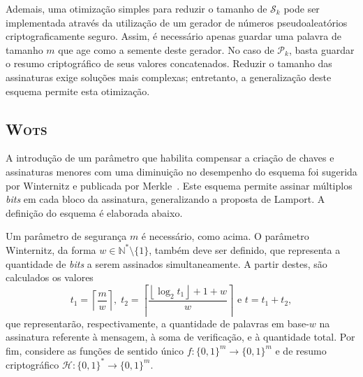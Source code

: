 \documentclass{ufsctex/ufsctex}
\newcommand{\hh}{\mathcal{H}}
\newcommand{\pk}{\mathcal{P}_{k}}
\newcommand{\sk}{\mathcal{S}_{k}}
\newcommand{\binwds}[1]{\{0, 1\}^{#1}}
\newcommand{\fhash}[1]{\hh{}: \binwds{*} \longrightarrow{} \binwds{#1}}
\newcommand{\wots}{\textsc{Wots}}
\begin{document}
Ademais, uma otimização simples para reduzir o tamanho de $\sk{}$ pode ser
implementada através da utilização de um gerador de números pseudoaleatórios
criptograficamente seguro. Assim, é necessário apenas guardar uma palavra de
tamanho $m$ que age como a semente deste gerador. No caso de $\pk{}$, basta
guardar o resumo criptográfico de seus valores concatenados. Reduzir o tamanho
das assinaturas exige soluções mais complexas; entretanto, a generalização
deste esquema permite esta otimização.

\subsection{\wots{}}\label{subsection:wots}

A introdução de um parâmetro que habilita compensar a criação de chaves e
assinaturas menores com uma diminuição no desempenho do esquema foi sugerida
por Winternitz e publicada por Merkle~\cite[Capítulo
5]{Merkle:inproc:1989:aug}. Este esquema permite assinar múltiplos \emph{bits}
em cada bloco da assinatura, generalizando a proposta de Lamport. A definição
do esquema é elaborada abaixo.

Um parâmetro de segurança $m$ é necessário, como acima. O parâmetro Winternitz,
da forma $w \in \mathbb{N}^{*}\setminus\{1\}$, também deve ser definido, que
representa a quantidade de \emph{bits} a serem assinados simultaneamente. A
partir destes, são calculados os valores \[t_{1} = \left\lceil \frac{m}{w}
\right\rceil, \; t_{2} = \left\lceil \frac{\left\lfloor \log_2 t_{1}
\right\rfloor + 1 + w}{w} \right\rceil \text{ e } t = t_{1} + t_{2},\] que
representarão, respectivamente, a quantidade de palavras em base-$w$ na
assinatura referente à mensagem, à soma de verificação, e à quantidade total.
Por fim, considere as funções de sentido único $f : \binwds{m} \longrightarrow
\binwds{m}$ e de resumo criptográfico $\fhash{m}$.
\end{document}
